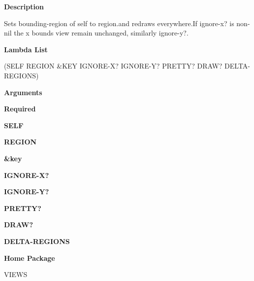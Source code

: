  
{\bf Description}

Sets bounding-region of self to region.and redraws everywhere.If ignore-x? is non-nil the x bounds view remain unchanged, similarly ignore-y?.

 
{\bf Lambda List}

(SELF REGION \&KEY IGNORE-X? IGNORE-Y? PRETTY? DRAW? DELTA-REGIONS)

 
{\bf Arguments}


\beginhang
{\bf Required}\hspace{2em}
 
{\bf SELF}


 
{\bf REGION}


 
\endhang
\beginhang
{\bf \&key}\hspace{2em}
 
{\bf IGNORE-X?}


 
{\bf IGNORE-Y?}


 
{\bf PRETTY?}


 
{\bf DRAW?}


 
{\bf DELTA-REGIONS}


 
\endhang
 
{\bf Home Package}

VIEWS

